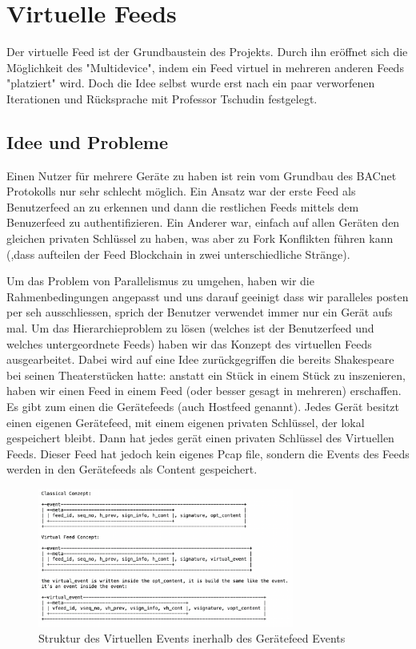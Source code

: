 \documentclass[a4paper,titlepage]{article}
\begin{document}
\section{Virtuelle Feeds}
Der virtuelle Feed ist der Grundbaustein des Projekts. Durch ihn eröffnet sich die Möglichkeit des "Multidevice", indem ein Feed virtuel in mehreren anderen Feeds "platziert" wird. Doch die Idee selbst wurde erst nach ein paar verworfenen Iterationen und Rücksprache mit Professor Tschudin festgelegt.

\subsection{Idee und Probleme}
Einen Nutzer für mehrere Geräte zu haben ist rein vom Grundbau des BACnet Protokolls nur sehr schlecht möglich. Ein Ansatz war der erste Feed als Benutzerfeed an zu erkennen und dann die restlichen Feeds mittels dem Benuzerfeed zu authentifizieren. Ein Anderer war, einfach auf allen Geräten den gleichen privaten Schlüssel zu haben, was aber zu Fork Konflikten führen kann (,dass aufteilen der Feed Blockchain in zwei unterschiedliche Stränge).

Um das Problem von Parallelismus zu umgehen, haben wir die Rahmenbedingungen angepasst und uns darauf geeinigt dass wir paralleles posten per seh ausschliessen, sprich der Benutzer verwendet immer nur ein Gerät aufs mal. Um das Hierarchieproblem zu lösen (welches ist der Benutzerfeed und welches untergeordnete Feeds) haben wir das Konzept des virtuellen Feeds ausgearbeitet. Dabei wird auf eine Idee zurückgegriffen die bereits Shakespeare bei seinen Theaterstücken hatte: anstatt ein Stück in einem Stück zu inszenieren, haben wir einen Feed in einem Feed (oder besser gesagt in mehreren) erschaffen. Es gibt zum einen die Gerätefeeds (auch Hostfeed genannt). Jedes Gerät besitzt einen eigenen Gerätefeed, mit einem eigenen privaten Schlüssel, der lokal gespeichert bleibt. Dann hat jedes gerät einen privaten Schlüssel des Virtuellen Feeds. Dieser Feed hat jedoch kein eigenes Pcap file, sondern die Events des Feeds werden in den Gerätefeeds als Content gespeichert.

\begin{figure}[h!]
   \centering
   \includegraphics[width=0.75\textwidth]{figures/vFeedStructure}  
   \caption*{Struktur des Virtuellen Events inerhalb des Gerätefeed Events }
   \label{fig-virtual_event_structure}
\end{figure}
\end{document}
